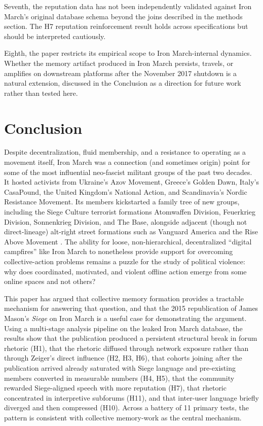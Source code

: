 \documentclass[bibtex,autowc,nonblind]{apsr_submission}
\begin{document}
Seventh, the reputation data has not been independently validated against Iron March's original database schema beyond the joins described in the methods section. The H7 reputation reinforcement result holds across specifications but should be interpreted cautiously.

Eighth, the paper restricts its empirical scope to Iron March-internal dynamics. Whether the memory artifact produced in Iron March persists, travels, or amplifies on downstream platforms after the November 2017 shutdown is a natural extension, discussed in the Conclusion as a direction for future work rather than tested here.

\section{Conclusion}

Despite decentralization, fluid membership, and a resistance to operating as a movement itself, Iron March was a connection (and sometimes origin) point for some of the most influential neo-fascist militant groups of the past two decades. It hosted activists from Ukraine's Azov Movement, Greece's Golden Dawn, Italy's CasaPound, the United Kingdom's National Action, and Scandinavia's Nordic Resistance Movement. Its members kickstarted a family tree of new groups, including the Siege Culture terrorist formations Atomwaffen Division, Feuerkrieg Division, Sonnenkrieg Division, and The Base, alongside adjacent (though not direct-lineage) alt-right street formations such as Vanguard America and the Rise Above Movement \citep{newhouse2021threat, ware2019siege, sunshine2024neo}. The ability for loose, non-hierarchical, decentralized ``digital campfires'' like Iron March to nonetheless provide support for overcoming collective-action problems remains a puzzle for the study of political violence: why does coordinated, motivated, and violent offline action emerge from some online spaces and not others?

This paper has argued that collective memory formation provides a tractable mechanism for answering that question, and that the 2015 republication of James Mason's \textit{Siege} on Iron March is a useful case for demonstrating the argument. Using a multi-stage analysis pipeline on the leaked Iron March database, the results show that the publication produced a persistent structural break in forum rhetoric (H1), that the rhetoric diffused through network exposure rather than through Zeiger's direct influence (H2, H3, H6), that cohorts joining after the publication arrived already saturated with Siege language and pre-existing members converted in measurable numbers (H4, H5), that the community rewarded Siege-aligned speech with more reputation (H7), that rhetoric concentrated in interpretive subforums (H11), and that inter-user language briefly diverged and then compressed (H10). Across a battery of 11 primary tests, the pattern is consistent with collective memory-work as the central mechanism.
\end{document}
